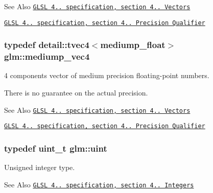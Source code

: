 \begin{DoxySeeAlso}{See Also}
\href{http://www.opengl.org/registry/doc/GLSLangSpec.4.20.8.pdf}{\tt G\-L\-S\-L 4.. specification, section 4.. Vectors} 

\href{http://www.opengl.org/registry/doc/GLSLangSpec.4.20.8.pdf}{\tt G\-L\-S\-L 4.. specification, section 4.. Precision Qualifier} 
\end{DoxySeeAlso}
\hypertarget{group__core__precision_ga592096fcf2ef1662f2c0dbbc7754e80c}{
\subsubsection[{mediump\-\_\-vec4}]{\setlength{\rightskip}{0pt plus 5cm}typedef detail\-::tvec4$<$mediump\-\_\-float$>$ {\bf glm\-::mediump\-\_\-vec4}}}\label{group__core__precision_ga592096fcf2ef1662f2c0dbbc7754e80c}


4 components vector of medium precision floating-\/point numbers. 

There is no guarantee on the actual precision.

\begin{DoxySeeAlso}{See Also}
\href{http://www.opengl.org/registry/doc/GLSLangSpec.4.20.8.pdf}{\tt G\-L\-S\-L 4.. specification, section 4.. Vectors} 

\href{http://www.opengl.org/registry/doc/GLSLangSpec.4.20.8.pdf}{\tt G\-L\-S\-L 4.. specification, section 4.. Precision Qualifier} 
\end{DoxySeeAlso}
\hypertarget{group__core__precision_ga483f6011e60602f0b73bfd0acad0f04c}{
\subsubsection[{uint}]{\setlength{\rightskip}{0pt plus 5cm}typedef uint\-\_\-t {\bf glm\-::uint}}}\label{group__core__precision_ga483f6011e60602f0b73bfd0acad0f04c}


Unsigned integer type. 

\begin{DoxySeeAlso}{See Also}
\href{http://www.opengl.org/registry/doc/GLSLangSpec.4.20.8.pdf}{\tt G\-L\-S\-L 4.. specification, section 4.. Integers} 
\end{DoxySeeAlso}
